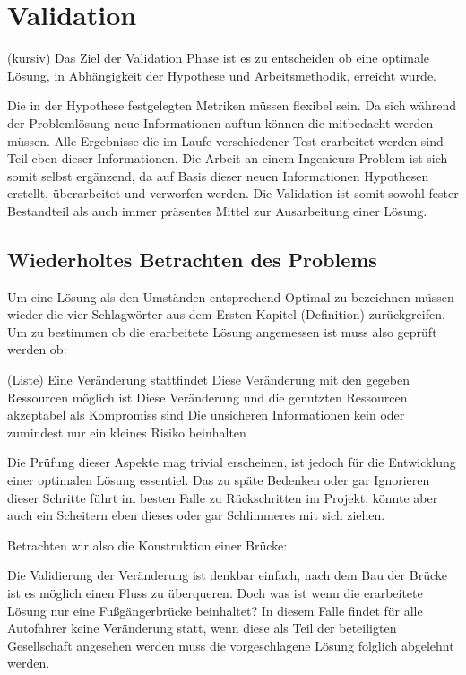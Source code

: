 \section{Validation}

(kursiv) 
Das Ziel der Validation Phase ist es zu entscheiden ob eine optimale Lösung, in Abhängigkeit der 
Hypothese und Arbeitsmethodik,  erreicht wurde.

Die in der Hypothese festgelegten Metriken müssen flexibel sein. Da sich während der Problemlösung 
neue Informationen auftun können die mitbedacht werden müssen. Alle Ergebnisse die im Laufe 
verschiedener Test erarbeitet werden sind Teil eben dieser Informationen. Die Arbeit an einem 
Ingenieurs-Problem ist sich somit selbst ergänzend, da auf Basis dieser neuen Informationen 
Hypothesen erstellt, überarbeitet und verworfen werden. Die Validation ist somit sowohl fester 
Bestandteil als auch immer präsentes Mittel zur Ausarbeitung einer Lösung.

    \subsection{Wiederholtes Betrachten des Problems}

    Um eine Lösung als den Umständen entsprechend Optimal zu bezeichnen müssen wieder die 
    vier Schlagwörter aus dem Ersten Kapitel (Definition) zurückgreifen. Um zu bestimmen ob 
    die erarbeitete Lösung angemessen ist muss also geprüft werden ob:

        (Liste)
        Eine Veränderung stattfindet
        Diese Veränderung mit den gegeben Ressourcen möglich ist
        Diese Veränderung und die genutzten Ressourcen akzeptabel als Kompromiss sind
        Die unsicheren Informationen kein oder zumindest nur ein kleines Risiko beinhalten

    Die Prüfung dieser Aspekte mag trivial erscheinen, ist jedoch für die Entwicklung einer optimalen 
    Lösung essentiel. Das zu späte Bedenken oder gar Ignorieren dieser Schritte führt im besten Falle 
    zu Rückschritten im Projekt, könnte aber auch ein Scheitern eben dieses oder gar Schlimmeres mit 
    sich ziehen.

    Betrachten wir also die Konstruktion einer Brücke:

    Die Validierung der Veränderung ist denkbar einfach, nach dem Bau der Brücke ist es möglich 
    einen Fluss zu überqueren. Doch was ist wenn die erarbeitete Lösung nur eine Fußgängerbrücke 
    beinhaltet? In diesem Falle findet für alle Autofahrer keine Veränderung statt, wenn diese als 
    Teil der beteiligten Gesellschaft angesehen werden muss die vorgeschlagene Lösung folglich 
    abgelehnt werden.

